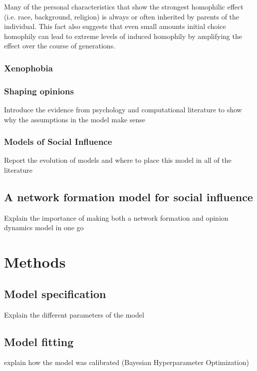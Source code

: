 \documentclass[9pt,twocolumn,twoside]{ilcss}
\begin{document}
Many of the personal characteristics that show the strongest homophilic effect (i.e. race, background, religion) is always or often inherited by parents of the individual.
This fact also suggests that even small amounts initial choice homophily can lead to extreme levels of induced homophily by amplifying the effect over the course of generations. 

\subsubsection{Xenophobia}

\subsubsection{Shaping opinions}

Introduce the evidence from psychology and computational literature to show why the assumptions in the model make sense

\subsubsection{Models of Social Influence}

Report the evolution of models and where to place this model in all of the literature

\subsection{A network formation model for social influence}

Explain the importance of making both a network formation and opinion dynamics model in one go

\section{Methods}

\subsection{Model specification}

Explain the different parameters of the model

\subsection{Model fitting}

explain how the model was calibrated (Bayesian Hyperparameter Optimization)
\end{document}
